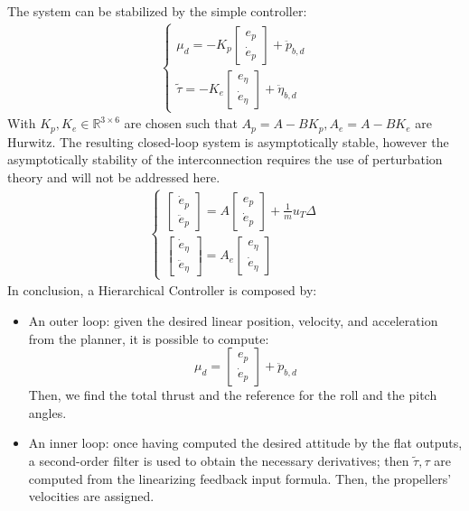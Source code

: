 The system can be stabilized by the simple controller:
\begin{gather*}
    \begin{cases}
        \mu_d=-K_p
        \begin{bmatrix}
            e_p \\ \dot{e}_p
        \end{bmatrix} + \ddot{p}_{b,d}\\
        \tilde{\tau}=-K_{e}
        \begin{bmatrix}
            e_\eta \\ \dot{e}_\eta
        \end{bmatrix}+\ddot{\eta}_{b,d}
    \end{cases}
\end{gather*}
With $K_p,K_e\in\mathbb{R}^{3\times 6}$ are chosen such that $A_p=A-BK_p, A_e=A-BK_e$ are Hurwitz. The resulting closed-loop system is asymptotically stable, however the asymptotically stability of the interconnection requires the use of perturbation theory and will not be addressed here. 
\begin{gather*}
    \begin{cases}
        \begin{bmatrix}
            \dot{e}_p \\ \ddot{e}_p
        \end{bmatrix}=A
        \begin{bmatrix}
            e_p \\ \dot{e}_p
        \end{bmatrix}+\frac{1}{m}u_{T}\Delta\\
        \begin{bmatrix}
            \dot{e}_\eta \\ \ddot{e}_\eta
        \end{bmatrix}=A_e
        \begin{bmatrix}
            e_\eta \\ \dot{e}_\eta
        \end{bmatrix}
    \end{cases}
\end{gather*}
In conclusion, a Hierarchical Controller is composed by:
\begin{itemize}
    \item An outer loop: given the desired linear position, velocity, and acceleration from the planner, it is possible to compute:
    \begin{equation*}
        \mu_d =
        \begin{bmatrix}
            e_p \\ \dot{e}_p
        \end{bmatrix}+\ddot{p}_{b,d}
    \end{equation*}
    Then, we find the total thrust and the reference for the roll and the pitch angles.
    \item An inner loop: once having computed the desired attitude by the flat outputs, a second-order filter is used to obtain the necessary derivatives; then $\tilde{\tau},\tau$ are computed from the linearizing feedback input formula. Then, the propellers' velocities are assigned.
\end{itemize}
